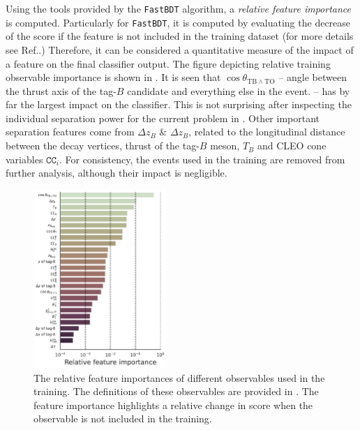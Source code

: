 Using the tools provided by the \texttt{FastBDT} algorithm, a \textit{relative feature importance} is computed.
Particularly for \texttt{FastBDT}, it is computed by evaluating the decrease of the \AUC score if the feature is not included in the training dataset (for more details see Ref.\cite{Keck:2017gsv}.)
Therefore, it can be considered a quantitative measure of the impact of a feature on the final classifier output.
The figure depicting relative training observable importance is shown in . 
It is seen that $\cos\theta_{\mathrm{TB}\wedge\mathrm{TO}}$ -- angle between the thrust axis of the tag-$B$ candidate and everything else in the event. 
-- has by far the largest impact on the classifier.
This is not surprising after inspecting the individual separation power for the current problem in .
Other important separation features come from  $\Delta z_B$ \&  $\Delta z_B$, related to the longitudinal distance between the decay vertices,
thrust of the tag-$B$ meson, $T_B$ and CLEO cone variables $\mathtt{CC}_i$. 
For consistency, the events used in the training are removed from further analysis, although their impact is negligible.

\begin{figure}[htbp!]
    \centering
    \includegraphics[width=0.45\textwidth]{figures/continuum_suppression/feature_importance.pdf}
    \caption{\label{fig:feature_importance} The relative feature importances of different observables used in the training.
    The definitions of these observables are provided in .
    The feature importance highlights a relative change in \AUC score when the observable is not included in the training.
    }
\end{figure}

